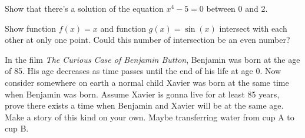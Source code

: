\documentclass[Calculus 1 Recitation.tex]{subfiles}
\begin{document}
\begin{myleftlinebox}
	Show that there's a solution of the equation $x^4-5=0$ between $0$ and $2$.
	\tcblower
	\vspace{2em}
\end{myleftlinebox}

\begin{myleftlinebox}
	Show function $f(x)=x$ and function $g(x)=\sin(x)$ intersect with each other at only one point. Could this number of intersection be an even number?
	\tcblower
	\vspace{2em}
\end{myleftlinebox}

\begin{myleftlinebox}
	In the film \emph{The Curious Case of Benjamin Button}, Benjamin was born at the age of 85. His age decreases as time passes until the end of his life at age 0. Now consider somewhere on earth a normal child Xavier was born at the same time when Benjamin was born. Assume Xavier is gonna live for at least 85 years, prove there exists a time when Benjamin and Xavier will be at the same age. Make a story of this kind on your own. Maybe transferring water from cup A to cup B.
	\tcblower
	\vspace{2em}
\end{myleftlinebox}
\end{document}
